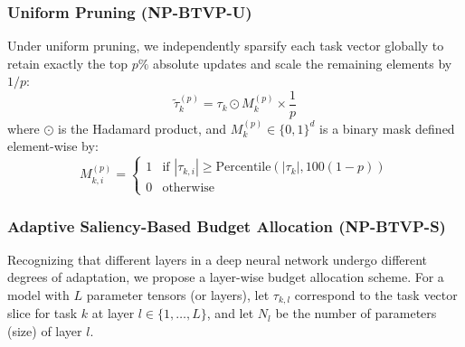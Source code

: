 \subsubsection{Uniform Pruning (NP-BTVP-U)}
Under uniform pruning, we independently sparsify each task vector globally to retain exactly the top $p\%$ absolute updates and scale the remaining elements by $1/p$:
\begin{equation}
\tilde{\tau}_k^{(p)} = \tau_k \odot M_k^{(p)} \times \frac{1}{p}
\end{equation}
where $\odot$ is the Hadamard product, and $M_k^{(p)} \in \{0, 1\}^d$ is a binary mask defined element-wise by:
\begin{equation}
M_{k, i}^{(p) } = \begin{cases} 1 & \text{if } |\tau_{k, i}| \ge \text{Percentile}(|\tau_k|, 100(1-p)) \\ 0 & \text{otherwise} \end{cases}
\end{equation}

\subsubsection{Adaptive Saliency-Based Budget Allocation (NP-BTVP-S)}
Recognizing that different layers in a deep neural network undergo different degrees of adaptation, we propose a layer-wise budget allocation scheme. For a model with $L$ parameter tensors (or layers), let $\tau_{k, l}$ correspond to the task vector slice for task $k$ at layer $l \in \{1, \dots, L\}$, and let $N_l$ be the number of parameters (size) of layer $l$.


